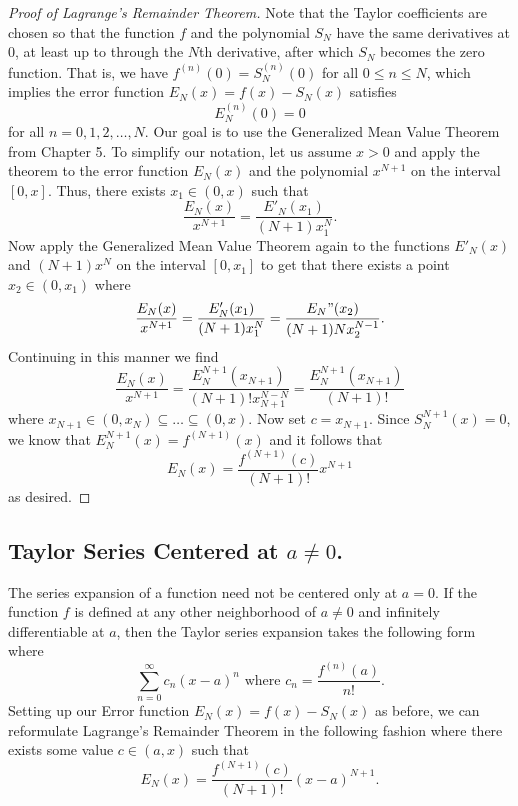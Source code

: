 \begin{proof}[Proof of Lagrange's Remainder Theorem]
    Note that the Taylor coefficients are chosen so that the function \( f  \) and the polynomial \( S_N  \) have the same derivatives at \( 0  \), at least up to through the \( N \)th derivative, after which \( S_N  \) becomes the zero function. That is, we have \( f^{(n)}(0) = S_N^{(n)}(0) \) for all \( 0 \leq n \leq N  \), which implies the error function \( E_{N}(x) = f(x) - S_{N}(x)  \) satisfies 
    \[  E_N^{(n)}(0) = 0  \] for all \( n = 0,1,2, \dots, N .  \)
    Our goal is to use the Generalized Mean Value Theorem from Chapter 5. To simplify our notation, let us assume \( x > 0  \) and apply the theorem to the error function \( E_{N}(x)  \) and the polynomial \( x^{N+1} \) on the interval \( [0,x] \). Thus, there exists \( x_1 \in (0,x ) \) such that 
    \[  \frac{ E_{N}(x) }{ x^{N+1}  } = \frac{ E'_N(x_1) }{ (N+1) x_{1}^N  }. \]
    Now apply the Generalized Mean Value Theorem again to the functions \( E'_{N }(x)  \) and \( (N+1) x^N  \) on the interval \( [0,x_{1}] \) to get that there exists a point \( x_2 \in (0,x_1) \) where
    \[  \frac{ E_{N}(x) }{ x^{N+1}  } = \frac{ E'_N(x_1) }{ (N+1) x_{1}^N  } = \frac{ E_N"(x_2) }{ (N+1)Nx_2^{N-1} } . \]
    Continuing in this manner we find 
    \[  \frac{ E_{N}(x)  }{ x^{N+1} }  =  \frac{ E_{N}^{N+1} (x_{N+1}) }{ (N+1)! x_{N+1}^{N-N} } =  \frac{ E_{N}^{N+1} (x_{N+1}) }{ (N+1)! }  \] 
    where \( x_{N+1} \in (0, x_{N}) \subseteq \dots \subseteq (0,x) \). Now set \( c = x_{N+1} \). Since \( S_{N}^{N+1}(x) = 0  \), we know that \( E_{N}^{N+1}(x) = f^{(N+1)}(x) \) and it follows that 
    \[ E_{N}(x) = \frac{ f^{(N+1)}(c) }{ (N+1)! } x^{N+1}  \] as desired.
\end{proof} 

\subsection{Taylor Series Centered at \( a \neq 0  \).}

The series expansion of a function need not be centered only at \( a = 0  \). If the function \( f \) is defined at any other neighborhood of \( a \neq 0  \) and infinitely differentiable at \( a  \), then the Taylor series expansion takes the following form where 
\[  \sum_{ n=0 }^{ \infty  } c_{n} (x-a)^{n} \text{ where } c_{n} = \frac{ f^{(n)}(a) }{ n! }. \]
Setting up our Error function \( E_{N}(x) = f(x) - S_{N}(x)  \) as before, we can reformulate Lagrange's Remainder Theorem in the following fashion where there exists some value \( c \in (a, x) \) such that 
\[  E_N(x) = \frac{ f^{(N+1)}(c) }{ (N+1)! } (x-a)^{N+1}. \]

